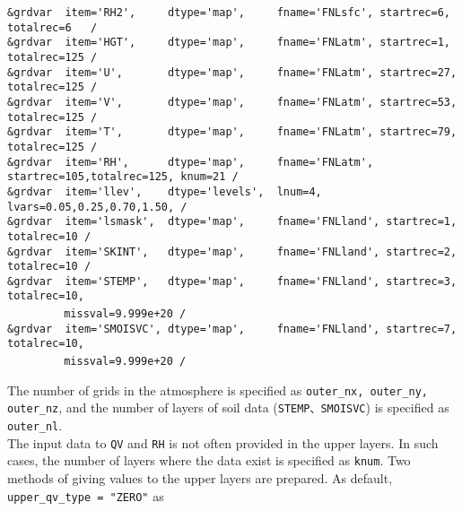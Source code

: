 {\verb|&grdvar  item='RH2',     dtype='map',     fname='FNLsfc', startrec=6,  totalrec=6   / |  \\
\verb|&grdvar  item='HGT',     dtype='map',     fname='FNLatm', startrec=1,  totalrec=125 / |  \\
\verb|&grdvar  item='U',       dtype='map',     fname='FNLatm', startrec=27, totalrec=125 / |  \\
\verb|&grdvar  item='V',       dtype='map',     fname='FNLatm', startrec=53, totalrec=125 / |  \\
\verb|&grdvar  item='T',       dtype='map',     fname='FNLatm', startrec=79, totalrec=125 / |  \\
\verb|&grdvar  item='RH',      dtype='map',     fname='FNLatm', startrec=105,totalrec=125, knum=21 /  |  \\
\verb|&grdvar  item='llev',    dtype='levels',  lnum=4, lvars=0.05,0.25,0.70,1.50, /        |  \\
\verb|&grdvar  item='lsmask',  dtype='map',     fname='FNLland', startrec=1, totalrec=10 /  |  \\
\verb|&grdvar  item='SKINT',   dtype='map',     fname='FNLland', startrec=2, totalrec=10 /  |  \\
\verb|&grdvar  item='STEMP',   dtype='map',     fname='FNLland', startrec=3, totalrec=10,|\\
~~~~~~~~\verb| missval=9.999e+20 /|  \\
\verb|&grdvar  item='SMOISVC', dtype='map',     fname='FNLland', startrec=7, totalrec=10,|\\
~~~~~~~~\verb| missval=9.999e+20 /|  \\
}

The number of grids in the atmosphere is specified as \verb|outer_nx, outer_ny, outer_nz|, and the number of layers of soil data (\verb|STEMP、SMOISVC|) is specified as \verb|outer_nl|.\\

The input data to \verb|QV| and \verb|RH| is not often provided in the upper layers.
In such cases, the number of layers where the data exist is specified as \verb|knum|. Two methods of giving values to the upper layers are prepared. As default, \verb| upper_qv_type = "ZERO"| as

